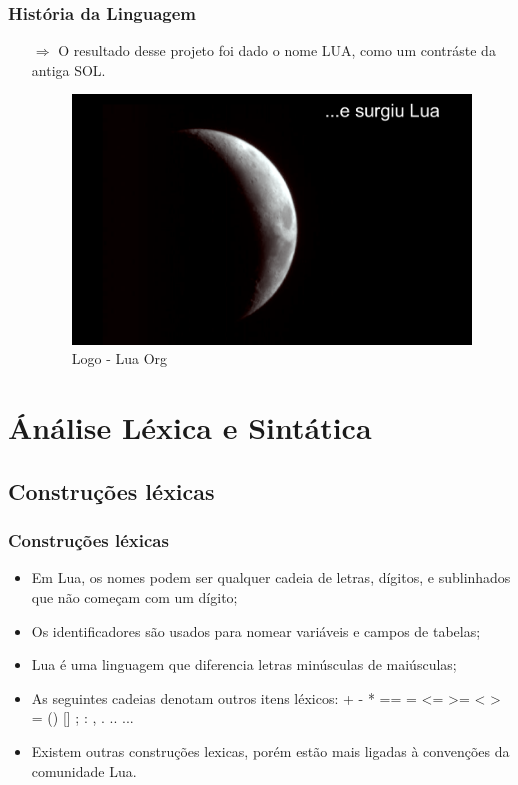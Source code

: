 ﻿\documentclass{beamer}
\begin{document}
\begin{frame}[fragile]
\frametitle{História da Linguagem}
\begin{itemize}
\item[$\Rightarrow$] O resultado desse projeto foi dado o nome LUA, como um contráste da antiga SOL.
\begin{figure}[!htb]
\centering
\includegraphics[width=1\linewidth]{imagens/lua}
\caption{Logo - Lua Org}
\end{figure}
\end{itemize}
\end{frame}

\section{Ánálise Léxica e Sintática}
\subsection{Construções léxicas}
\begin{frame}[fragile]
\frametitle{Construções léxicas}
\begin{itemize}
\item Em Lua, os nomes podem ser qualquer cadeia de letras, dígitos, e sublinhados que não começam com um dígito;
\item Os identificadores são usados para nomear variáveis e campos de tabelas;
\item Lua é uma linguagem que diferencia letras minúsculas de maiúsculas;
\item As seguintes cadeias denotam outros itens léxicos: + - * == = <= >= < > = () [] ; : , . .. ...
\item Existem outras construções lexicas, porém estão mais ligadas à convenções da comunidade Lua.
\end{itemize}
\end{frame}
\end{document}
